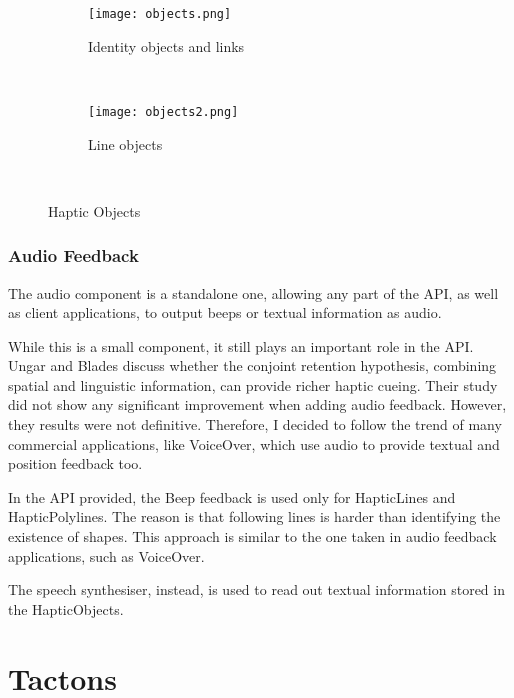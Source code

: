 \begin{figure}[H]
        \centering
        \begin{subfigure}[H]{0.4\textwidth}
                \texttt{[image: objects.png]}
                \caption{Identity objects and links}
                \label{fig:objects1}
        \end{subfigure}%
        ~ %
        \begin{subfigure}[H]{0.4\textwidth}
                \texttt{[image: objects2.png]}
                \caption{Line objects}
                \label{fig:objects2}
        \end{subfigure}
        ~ %
        \caption{Haptic Objects}\label{fig:hapticObjects}
\end{figure}

\subsubsection{Audio Feedback}

The audio component is a standalone one, allowing any part of the API, as well as client applications, to output beeps or textual information as audio.

While this is a small component, it still plays an important role in the API. Ungar and Blades \cite{ungar2000can} discuss whether the conjoint retention hypothesis, combining spatial and linguistic information, can provide richer haptic cueing. Their study did not show any significant improvement when adding audio feedback. However, they results were not definitive. Therefore, I decided to follow the trend of many commercial applications, like VoiceOver, which use audio to provide textual and position feedback too.

In the API provided, the Beep feedback is used only for HapticLines and HapticPolylines. The reason is that following lines is harder than identifying the existence of shapes. This approach is similar to the one taken in audio feedback applications, such as VoiceOver.

The speech synthesiser, instead, is used to read out textual information stored in the HapticObjects.

\section{Tactons}
\label{sec:designTactons} 

